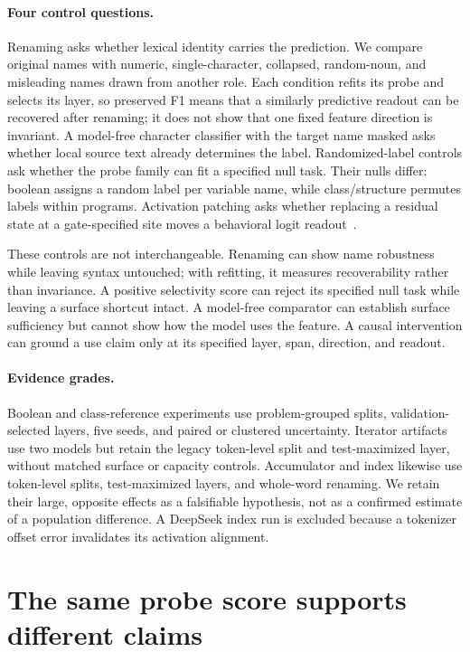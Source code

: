 \documentclass{article}
\begin{document}
\paragraph{Four control questions.}
Renaming asks whether lexical identity carries the prediction. We compare
original names with numeric, single-character, collapsed, random-noun, and
misleading names drawn from another role. Each condition refits its probe and
selects its layer, so preserved F1 means that a similarly predictive readout
can be recovered after renaming; it does not show that one fixed feature
direction is invariant. A model-free character classifier with the target name
masked asks whether local source text already determines the label.
Randomized-label controls ask whether the probe family can fit a specified null
task. Their nulls differ: boolean assigns a random label per variable name,
while class/structure permutes labels within programs. Activation patching asks
whether replacing a residual state at a gate-specified site moves a behavioral
logit readout~\citep{meng2022locating}.

These controls are not interchangeable. Renaming can show name robustness while
leaving syntax untouched; with refitting, it measures recoverability rather
than invariance. A positive selectivity score can reject its specified null
task while leaving a surface shortcut intact. A model-free comparator
can establish surface sufficiency but cannot show how the model uses the
feature. A causal intervention can ground a use claim only at its specified
layer, span, direction, and readout.

\paragraph{Evidence grades.}
Boolean and class-reference experiments use problem-grouped splits,
validation-selected layers, five seeds, and paired or clustered uncertainty.
Iterator artifacts use two models but retain the legacy token-level split and
test-maximized layer, without matched surface or capacity controls.
Accumulator and index likewise use token-level splits, test-maximized layers,
and whole-word renaming. We retain their large,
opposite effects as a falsifiable hypothesis, not as a confirmed estimate of a
population difference. A DeepSeek index run is excluded because a tokenizer
offset error invalidates its activation alignment.

\section{The same probe score supports different claims}
\end{document}
